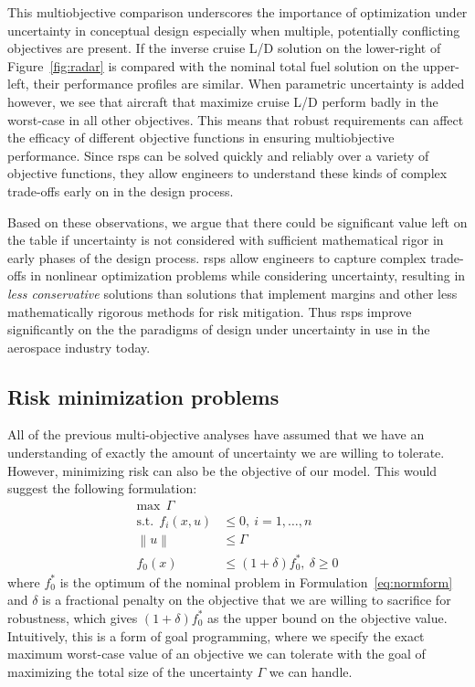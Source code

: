 This multiobjective comparison underscores the importance of optimization under uncertainty
in conceptual design especially when multiple, potentially conflicting objectives are present.
If the inverse cruise L/D solution
on the lower-right of Figure~\ref{fig:radar} is compared with the nominal total fuel solution on the upper-left, their
performance profiles are similar. When parametric uncertainty is added however, we see that aircraft
that maximize cruise L/D perform badly in the worst-case
in all other objectives. This means that robust requirements can
affect the efficacy of different objective functions in ensuring multiobjective performance.
Since \gls{rsp}s can be solved quickly and reliably over a variety of objective functions,
they allow engineers to understand these kinds of complex trade-offs early on in the design process.

Based on these observations, we argue that there could be significant value left on the table
if uncertainty is not considered with sufficient mathematical rigor in early phases of
the design process. \gls{rsp}s allow engineers to capture complex
trade-offs in nonlinear optimization problems while considering uncertainty,
resulting in \emph{less conservative} solutions
than solutions that implement margins and other less mathematically
rigorous methods for risk mitigation.
Thus \gls{rsp}s improve significantly on the
the paradigms of design under uncertainty in use
in the aerospace industry today.

\subsection{Risk minimization problems}

All of the previous multi-objective analyses have assumed that we have an
understanding of exactly the amount of uncertainty we are
willing to tolerate. However, minimizing risk can also be the objective of our
model. This would suggest the following formulation:
\begin{equation}
    \begin{split}
    \text{max}~~\Gamma \\
    \text{s.t.}~~f_i(x,u) &\leq 0,~i = 1,\ldots,n \\
                    \left\lVert u \right\rVert &\leq \Gamma \\
                    f_0(x) &\leq (1+\delta)f_0^*,~\delta \geq 0
    \end{split}
    \label{eq:goalprogramming}
\end{equation}
where $f_0^*$ is the optimum of the nominal problem in Formulation~\ref{eq:normform} and $\delta$
is a fractional penalty on the objective that we are willing to sacrifice for robustness, which
gives $(1+\delta)f_0^*$ as the upper bound on the objective value. Intuitively,
this is a form of goal programming,
where we specify the exact maximum worst-case value of an objective we can tolerate with
the goal of maximizing the total size of the uncertainty $\Gamma$ we can handle.

